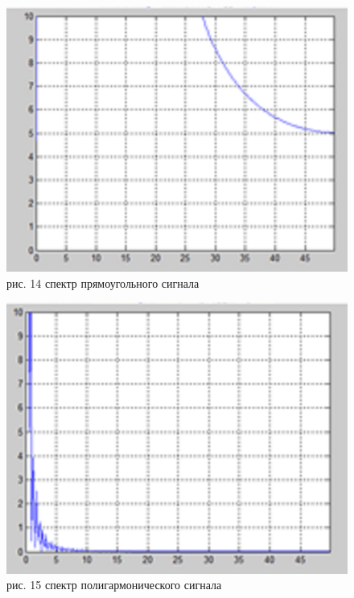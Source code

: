 \documentclass[10pt,a4paper]{report}
\begin{document}
\begin{figure}
\begin{center}
\includegraphics[angle=0, scale = 0.9]{14.png}\newline
рис. 14   спектр прямоугольного сигнала\newline
\end{center}
\end{figure}

\begin{figure}
\begin{center}
\includegraphics[angle=0, scale = 0.79]{15.png}\newline
рис. 15    спектр полигармонического сигнала\newline
\end{center}
\end{figure}
\end{document}
